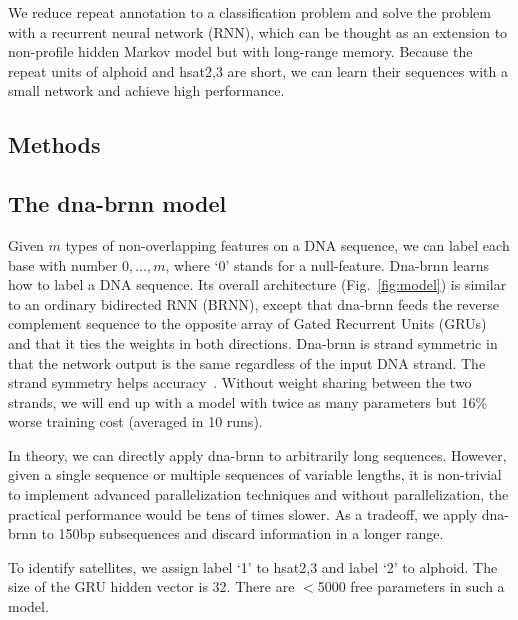 \documentclass{bioinfo}
\begin{document}
We reduce repeat annotation to a classification problem and solve the problem
with a recurrent neural network (RNN), which can be thought as an extension to
non-profile hidden Markov model but with long-range memory. Because the repeat
units of alphoid and hsat2,3 are short, we can learn their sequences with a
small network and achieve high performance.

\begin{methods}
\section{Methods}

\subsection{The dna-brnn model}

Given $m$ types of non-overlapping features on a DNA sequence, we can label
each base with number $0,\ldots,m$, where `0' stands for a null-feature.
\mbox{Dna-brnn} learns how to label a DNA sequence. Its overall architecture
(Fig.~\ref{fig:model}) is similar to an ordinary bidirected RNN
(BRNN), except that \mbox{dna-brnn} feeds the reverse complement sequence to the
opposite array of Gated Recurrent Units (GRUs) and that it ties the weights in both directions. Dna-brnn is
strand symmetric in that the network output is the same regardless of the input
DNA strand. The strand symmetry helps accuracy~\citep{Shrikumar103663}.
Without weight sharing between the two strands, we will end up with a model
with twice as many parameters but 16\% worse training cost (averaged in 10
runs).

In theory, we can directly apply dna-brnn to arbitrarily long sequences.
However, given a single sequence or multiple sequences of variable lengths, it
is non-trivial to implement advanced parallelization techniques and without
parallelization, the practical performance would be tens of times slower. As a
tradeoff, we apply dna-brnn to 150bp subsequences and discard information in a
longer range.

To identify satellites, we assign label `1' to hsat2,3 and label `2' to
alphoid. The size of the GRU hidden vector is 32. There are $<$5000 free
parameters in such a model.


\end{methods}
\end{document}
